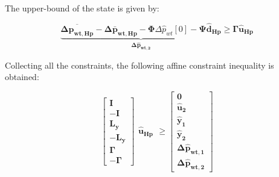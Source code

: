 The upper-bound of the state is given by:

\begin{equation}
\underbrace{\overline{\bm{\Delta p_{wt,Hp}}} - \bm{\Delta \bar{p}_{wt,Hp}} -  \bm{\Phi} \Delta \hat{p}_{wt}[0] - \bm{\Psi} \bm{\hat{d}_{Hp}}}_{\bm{\Delta \hat{p}_{wt,2}}} \geq \bm{\Gamma} \bm{\hat{u}_{Hp}}
\end{equation}

Collecting all the constraints, the following affine constraint inequality is obtained:

\begin{equation}
	\begin{bmatrix}
		\bm{I} 	\\
		-\bm{I} 	\\
		\bm{L_{y}}	\\
		-\bm{L_{y}}	\\
		\bm{\Gamma}	\\
		-\bm{\Gamma}
	\end{bmatrix}
	\begin{matrix}
			\bm{\hat{u}_{Hp}}
	\end{matrix}
	\geq 
	\begin{bmatrix}
			\bm{0}	\\
			\bm{\hat{u}_{2}}	\\
			\bm{\hat{y}_{1}}	\\
			\bm{\hat{y}_{2}}	\\
			\bm{\Delta \hat{p}_{wt,1}}	\\
			\bm{\Delta \hat{p}_{wt,2}}	
	\end{bmatrix}
\end{equation}






